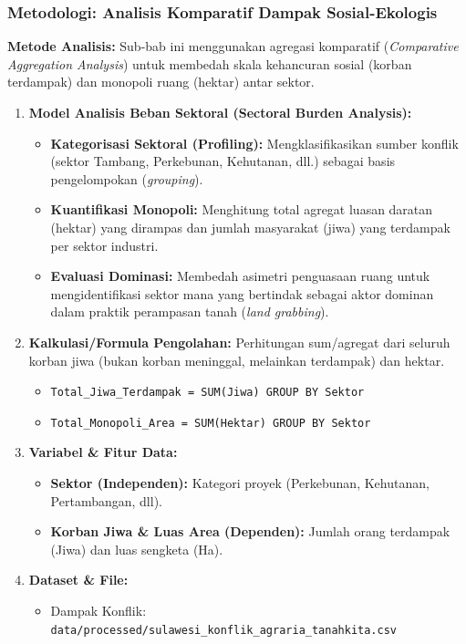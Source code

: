 \documentclass[
]{article}
\providecommand{\tightlist}{%
  \setlength{\itemsep}{0pt}\setlength{\parskip}{0pt}}
\begin{document}
\subsubsection{Metodologi: Analisis Komparatif Dampak
Sosial-Ekologis}\label{metodologi-analisis-komparatif-dampak-sosial-ekologis}

\textbf{Metode Analisis:} Sub-bab ini menggunakan agregasi komparatif
(\emph{Comparative Aggregation Analysis}) untuk membedah skala
kehancuran sosial (korban terdampak) dan monopoli ruang (hektar) antar
sektor.

\begin{enumerate}
\def\labelenumi{\arabic{enumi}.}
\tightlist
\item
  \textbf{Model Analisis Beban Sektoral (Sectoral Burden Analysis):}

  \begin{itemize}
  \tightlist
  \item
    \textbf{Kategorisasi Sektoral (Profiling):} Mengklasifikasikan
    sumber konflik (sektor Tambang, Perkebunan, Kehutanan, dll.) sebagai
    basis pengelompokan (\emph{grouping}).
  \item
    \textbf{Kuantifikasi Monopoli:} Menghitung total agregat luasan
    daratan (hektar) yang dirampas dan jumlah masyarakat (jiwa) yang
    terdampak per sektor industri.
  \item
    \textbf{Evaluasi Dominasi:} Membedah asimetri penguasaan ruang untuk
    mengidentifikasi sektor mana yang bertindak sebagai aktor dominan
    dalam praktik perampasan tanah (\emph{land grabbing}).
  \end{itemize}
\item
  \textbf{Kalkulasi/Formula Pengolahan:} Perhitungan sum/agregat dari
  seluruh korban jiwa (bukan korban meninggal, melainkan terdampak) dan
  hektar.

  \begin{itemize}
  \tightlist
  \item
    \texttt{Total\_Jiwa\_Terdampak\ =\ SUM(Jiwa)\ GROUP\ BY\ Sektor}
  \item
    \texttt{Total\_Monopoli\_Area\ =\ SUM(Hektar)\ GROUP\ BY\ Sektor}
  \end{itemize}
\item
  \textbf{Variabel \& Fitur Data:}

  \begin{itemize}
  \tightlist
  \item
    \textbf{Sektor (Independen):} Kategori proyek (Perkebunan,
    Kehutanan, Pertambangan, dll).
  \item
    \textbf{Korban Jiwa \& Luas Area (Dependen):} Jumlah orang terdampak
    (Jiwa) dan luas sengketa (Ha).
  \end{itemize}
\item
  \textbf{Dataset \& File:}

  \begin{itemize}
  \tightlist
  \item
    Dampak Konflik:
    \texttt{data/processed/sulawesi\_konflik\_agraria\_tanahkita.csv}
  \end{itemize}
\end{enumerate}
\end{document}
